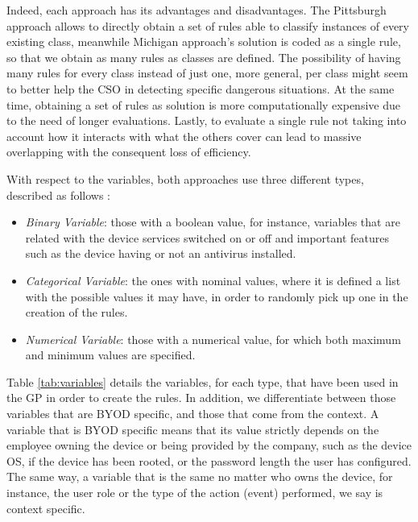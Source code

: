 \documentclass[runningheads]{llncs}
\begin{document}
Indeed, each approach has its advantages and disadvantages. The Pittsburgh approach allows to directly obtain a set of rules able to classify instances of every existing class, meanwhile Michigan approach's solution is coded as a single rule, so that we obtain as many rules as classes are defined. The possibility of having many rules for every class instead of just one, more general, per class might seem to better help the CSO in detecting specific dangerous situations.
At the same time, obtaining a set of rules as solution is more
computationally expensive due to the need of longer
evaluations. Lastly, to evaluate a single rule not taking into account
how it interacts with what the others cover \cite{freitas2002data}
can lead to massive overlapping with the consequent loss of
efficiency. 

With respect to the variables, both approaches use three different types, 
described as follows \cite{witten2005data}:

\begin{itemize}
\item {\em Binary Variable}: those with a boolean value, for instance, variables that are related with the device services switched on or off and important features such as the device having or not an antivirus installed. 
\item {\em Categorical Variable}: the ones with nominal values, where it is defined a list with the possible values it may have, in order to randomly pick up one in the creation of the rules. 
\item {\em Numerical Variable}: those with a numerical value, for which both maximum and minimum values are specified. 

\end{itemize}

Table \ref{tab:variables} details the variables, for each type, that have been used in the GP in order to create the rules. In addition, we differentiate between those variables that are BYOD specific, and those that come from the context. A variable that is BYOD specific means that its value strictly depends on the employee owning the device or being provided by the company, such as the device OS, if the device has been rooted, or the password length the user has configured. The same way, a variable that is the same no matter who owns the device, for instance, the user role or the type of the action (event) performed, we say is context specific.
\end{document}
